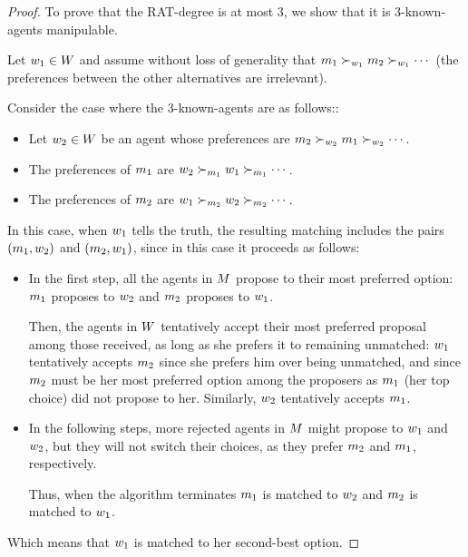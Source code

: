 \begin{proof}
    To prove that the RAT-degree is at most $3$, we show that it is $3$-known-agents manipulable. 

    Let $w_1 \in W$ and assume without loss of generality that $m_1 \succ_{w_1} m_2 \succ_{w_1} \cdots$  (the preferences between the other alternatives are irrelevant).

    Consider the case where the $3$-known-agents are as follows::
    \begin{itemize}
        \item Let $w_2 \in W$ be an agent whose preferences are $m_2 \succ_{w_2} m_1 \succ_{w_2} \cdots $.

        \item The preferences of $m_1$ are $w_2 \succ_{m_1} w_1 \succ_{m_1} \cdots$.

        \item The preferences of $m_2$ are $w_1 \succ_{m_2} w_2 \succ_{m_2} \cdots$.
    \end{itemize}



    In this case, when $w_1$ tells the truth, the resulting matching includes the pairs $(m_1, w_2)$ and $(m_2, w_1)$, since in this case it proceeds as follows:
    \begin{itemize}
        \item In the first step, all the agents in $M$ propose to their most preferred option: $m_1$ proposes to $w_2$ and $m_2$ proposes to $w_1$.

        Then, the agents in $W$ tentatively accept their most preferred proposal among those received, as long as she prefers it to remaining unmatched: 
        $w_1$ tentatively accepts $m_2$ since she prefers him over being unmatched, and since $m_2$ must be her most preferred option among the proposers as $m_1$ (her top choice) did not propose to her.
        Similarly, $w_2$ tentatively accepts $m_1$.

        \item In the following steps, more rejected agents in $M$ might propose to $w_1$ and $w_2$, but they will not switch their choices, as they prefer $m_2$ and $m_1$, respectively. 
        
        Thus, when the algorithm terminates $m_1$ is matched to $w_2$ and $m_2$ is matched to $w_1$. 
    \end{itemize}
    Which means that $w_1$ is matched to her second-best option.



\end{proof}

